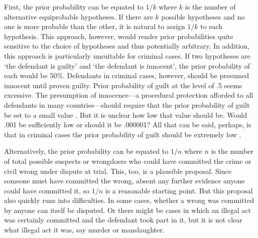 \documentclass{article}
\begin{document}
First, the prior probability can be equated to $1/k$ where $k$ is the number of alternative equiprobable hypotheses. If there are $k$ possible hypotheses and no one is more probable than the other, it is natural to assign $1/k$ to each hypothesis.  
This approach, however, would render prior probabilities quite sensitive to the choice of hypotheses and thus potentially arbitrary.  In addition, this approach is particularly unsuitable for criminal cases. If two hypotheses are `the defendant is guilty' and `the defendant is innocent', the prior probability  of each would be 50\%. 
Defendants in criminal cases, however, should be presumed innocent until proven guilty.  Prior probability of guilt at the level of .5 seems excessive. 
The presumption of innocence---a procedural protection afforded to all defendants in many countries---should require that the prior probability of guilt be set to a small value \citep{friedmanEtAl1995}.  But it is unclear how low that value should be. Would .001 be sufficiently low or should it be .000001?
All that can be said, perhaps, is that in criminal cases the prior probability of guilt should be extremely low \citep{Friedman2000}. 



Alternatively, the prior probability can be equated to $1/n$ where $n$ is the number of total possible suspects or wrongdoers who could have committed the crime or civil wrong under dispute at trial. This, too, is a plausible proposal. Since someone must have committed the wrong, absent any further evidence anyone could have committed it, so $1/n$ is a reasonable starting point. But  this proposal also quickly runs into difficulties. In some cases, whether a wrong was committed by anyone can itself be disputed. Or there might be cases in which an illegal act was certainly committed and the  defendant took part in it, but it is not clear what illegal act it was, say murder or manslaughter. 

 
 
 
\end{document}
